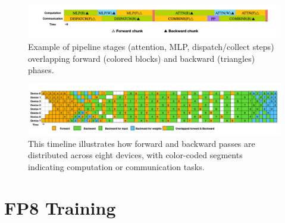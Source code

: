\documentclass{beamer}
\begin{document}
\begin{frame}
    \begin{figure}[htbp]
        \centering
        \includegraphics[scale=0.24365]{attachments/overlapping-strategy.png}
        \caption{Example of pipeline stages (attention, MLP, dispatch/collect steps) overlapping forward (colored blocks) and backward (triangles) phases.}
    \end{figure}
\end{frame}

\begin{frame}
    \begin{figure}[htbp]
        \centering
        \includegraphics[scale=0.24365]{attachments/dualpipe-scheduling.png}
        \caption{This timeline illustrates how forward and backward passes are distributed across eight devices, with color-coded segments indicating computation or communication tasks.}
    \end{figure}
\end{frame}

\section{FP8 Training}
\end{document}
